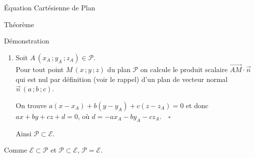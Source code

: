 \documentclass{coursbook}
\begin{document}
\begin{Gpartie}{Équation Cartésienne de Plan}
\begin{Spartie}{Théorème}
\begin{SSpartie}{Démonstration}
\begin{enumerate}[(1)]
                    C'est identique pour les points $\left(0\,; \frac{-d}{b}\,; 0\right)$ ou $\left(0\,; 0\,; \frac{-d}{c}\right)$.
                    
                    Donc, quel que soit $M\,\left(x\,; y\,; z\right)\in\mathcal{E}$ :
                    \[\begin{aligned}[t]
                        \overrightarrow{AM}\cdot\vec{n}=0&\iff\begin{psmallmatrix} x-\frac{-d}{a} \\ y \\ z\end{psmallmatrix}\cdot \begin{psmallmatrix}a \\ b \\ c\end{psmallmatrix} \\ &\iff a x+by+cz+d=0 %
                    \end{aligned}\]

                    Donc, tout point $M$ de $\mathcal{E}$ vérifie $\overrightarrow{AM}\cdot\vec{n}=0$, donc appartient au plan passant par $A$ et de vecteur normal $\vec{n}$. (c'est la caractérisation d'un plan) $\quad\square$

                    Ainsi, $\mathcal{E}\subset\mathcal{P}$.

                    \item   Soit $A\,\left(x_A\,; y_A\,; z_A\right)\in\mathcal{P}$. \\ Pour tout point $M\,\left(x\,; y\,; z\right)$ du plan $\mathcal{P}$ on calcule le produit scalaire $\overrightarrow{AM}\cdot\vec{n}$ qui est nul par définition (voir le rappel) d'un plan de vecteur normal $\vec{n}\,\left(a\,; b\,; c\right)$.
                    
                    On trouve $a\left(x-x_A\right)+b\left(y-y_A\right)+c\left(z-z_A\right)=0$ et donc $ax+by+cz+d=0$, où $d=-ax_A-by_A-cz_A.\quad\square$

                    Ainsi $\mathcal{P}\subset\mathcal{E}$.
                \end{enumerate}
                \vspace*{2ex}
                Comme $\mathcal{E}\subset\mathcal{P}$ et $\mathcal{P}\subset\mathcal{E}$, $\mathcal{P}=\mathcal{E}$.
            \end{SSpartie}
        \end{Spartie}
    \end{Gpartie}
\end{document}
